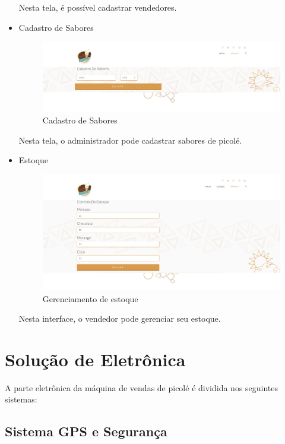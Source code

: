 \begin{itemize}
Nesta tela, é possível cadastrar vendedores.

\item{Cadastro de Sabores}

\begin{figure}[H]
	\centering
    \includegraphics[width=\textwidth]{figuras/cadastroSabores}
    \caption{Cadastro de Sabores}
    \label{fig:CadastroMaquinas}
\end{figure}

Nesta tela, o administrador pode cadastrar sabores de picolé.

\item{Estoque}

\begin{figure}[H]
	\centering
    \includegraphics[width=\textwidth]{figuras/storage}
    \caption{Gerenciamento de estoque}
    \label{fig:CadastroMaquinas}
\end{figure}

Nesta interface, o vendedor pode gerenciar seu estoque.

\end{itemize}

\section{Solução de Eletrônica}

A parte eletrônica da máquina de vendas de picolé é dividida nos seguintes sistemas:

\subsection{Sistema GPS e Segurança}

